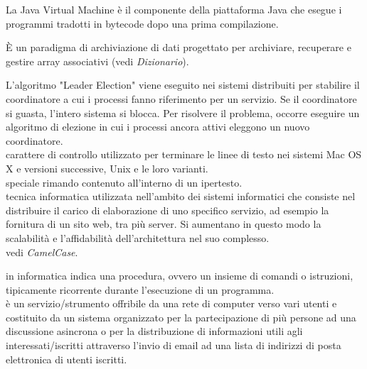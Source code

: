 \documentclass{scalatekids-article}
\begin{document}
   La Java Virtual Machine è il componente della piattaforma Java che esegue i programmi tradotti in bytecode dopo una prima compilazione.
  \\


   È un paradigma di archiviazione di dati progettato per archiviare, recuperare e gestire array associativi (vedi \textit{Dizionario}).
  \\

  
 L'algoritmo "Leader Election" viene eseguito nei sistemi distribuiti per stabilire il coordinatore a cui i processi fanno riferimento per un servizio.
Se il coordinatore si guasta, l'intero sistema si blocca. Per risolvere il problema, occorre eseguire un algoritmo di elezione in cui i processi ancora attivi eleggono un nuovo coordinatore.
\\

 carattere di controllo utilizzato per terminare le linee di testo nei sistemi Mac OS X e versioni successive, Unix e le loro varianti.
\\

   speciale rimando contenuto all'interno di un ipertesto.
  \\
  
   tecnica informatica utilizzata nell'ambito dei sistemi informatici che consiste nel distribuire il carico di elaborazione di uno specifico servizio, ad esempio la fornitura di un sito web, tra più server. Si aumentano in questo modo la scalabilità e l'affidabilità dell'architettura nel suo complesso.
  \\

   vedi \textit{CamelCase}.
  \\


   in informatica indica una procedura, ovvero un insieme di comandi o istruzioni, tipicamente ricorrente durante l'esecuzione di un programma.
  \\

   è un servizio/strumento offribile da una rete di computer verso vari utenti e costituito da un sistema organizzato per la partecipazione di più persone ad una discussione asincrona o per la distribuzione di informazioni utili agli interessati/iscritti attraverso l'invio di email ad una lista di indirizzi di posta elettronica di utenti iscritti.
  \\
\end{document}
